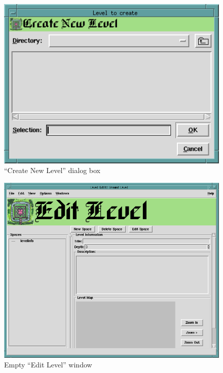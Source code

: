 \begin{figure}[hbpt] 
\begin{centering}
\includegraphics{CreateNewLevel.png} 
\caption{``Create New Level'' dialog box} 
\label{fig:createnewlevel} 
\end{centering}
\end{figure} 
\begin{figure}[hbpt]
\begin{centering}
\includegraphics[width=5in]{EmptyLevelEditorWindow.png}
\caption{Empty ``Edit Level'' window}
\label{fig:emptyleveleditor}
\end{centering}
\end{figure}
